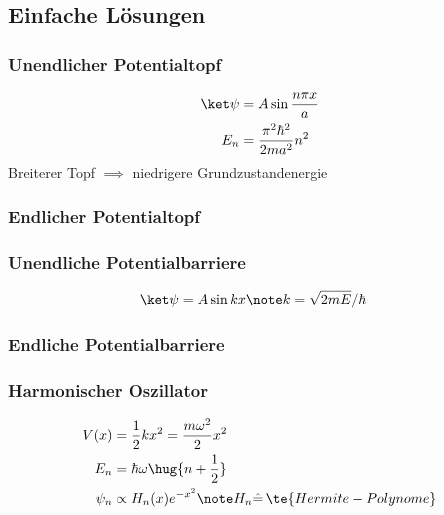 \documentclass[twocolumn, unnumberedsubsub]{summery_3.1}
\begin{document}
\subsection{Einfache Lösungen}
\subsubsection{Unendlicher Potentialtopf}\tight
\begin{align*}
    \ket \psi &= A\sin\frac{n\pi x}{a} \\
    E_n &= \frac{\pi^2\hbar^2}{2m a^2} n^2
\end{align*}
Breiterer Topf \(\implies\) niedrigere Grundzustandenergie

\subsubsection{Endlicher Potentialtopf}

\subsubsection{Unendliche Potentialbarriere}\tight
\begin{align*}
    \ket \psi &= A\sin kx \note k=\sqrt{2m E} /\hbar
\end{align*}
\subsubsection{Endliche Potentialbarriere}
\subsubsection{Harmonischer Oszillator}\tight
\begin{align*}
    V(x) &= \frac12k x^2 = \frac{m\omega^2}{2}x^2\\
    E_n &= \hbar \omega\hug{n+\frac12}\\
    \psi_n &\propto H_n(x) e^{-x^2}\note H_n \hat =\, \te{Hermite-Polynome}
\end{align*}
\end{document}
